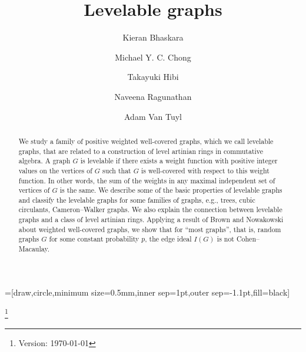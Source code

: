 \documentclass[12pt]{amsart}
\numberwithin{equation}{section}
\theoremstyle{definition}
\newcounter{i} %
\begin{document}
=[draw,circle,minimum size=0.5mm,inner sep=1pt,outer sep=-1.1pt,fill=black]

 
\title{Levelable graphs}
\thanks{Version: \today}

\author[K. Bhaskara]{Kieran Bhaskara}
\address[K. Bhaskara]{Department of Mathematics and Statistics\\
McMaster University, Hamilton, ON, L8S 4L8, Canada}

\author[M. Y. C. Chong]{Michael Y. C. Chong}
\address[M. Y. C. Chong]{Department of Sociology,
University of Oxford,
42-43 Park End Street,
Oxford,
OX1 1JD,
United Kingdom}
\address[M. Y. C. Chong]{Nuffield College,
University of Oxford,
New Road, Oxford,
OX1 1NF,
United Kingdom}
\address[M. Y. C. Chong]{Leverhulme Centre for Demographic Science,
University of Oxford,
42-43 Park End Street,
Oxford,
OX1 1JD,
United Kingdom}

\author[T. Hibi]{Takayuki Hibi}
\address[T. Hibi]{Department of Pure and Applied Mathematics, Graduate School
of Information Science and Technology, The University of Osaka, Suita, Osaka
565-0871, Japan}

\author[N. Ragunathan]{Naveena Ragunathan}
\address[N. Ragunathan]{Department of Mathematics and Statistics\\
McMaster University, Hamilton, ON, L8S 4L8, Canada}
 
\author[A. Van Tuyl]{Adam Van Tuyl}
\address[A. Van Tuyl]{Department of Mathematics and Statistics\\
McMaster University, Hamilton, ON, L8S 4L8, Canada}


 
\begin{abstract}
We study a family of positive weighted well-covered
graphs, which we call levelable graphs, that are 
related to a construction
of level artinian rings in commutative algebra.  
A graph $G$ is levelable if there exists a weight function
with positive integer values 
on the vertices of $G$ such that $G$ is well-covered with
respect to this weight function. In other words, the sum of the weights in
any maximal independent set of vertices of $G$ is the same.  
We describe some of the basic properties of levelable 
graphs and classify the levelable
graphs for some families of graphs, e.g., trees,
cubic circulants, Cameron--Walker graphs. 
We also explain the connection between levelable graphs
and a class of level artinian rings. Applying a result
of Brown and Nowakowski about weighted well-covered graphs, we 
show that for ``most graphs'', 
that is, random graphs $G$ for some constant
probability $p$,
the edge ideal $I(G)$ is  not Cohen--Macaulay.
\end{abstract}
 
\end{document}
